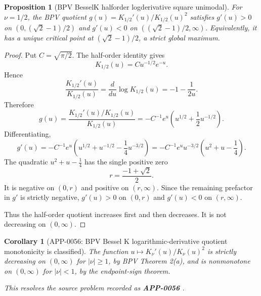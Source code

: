 \documentclass[11pt]{article}
\numberwithin{equation}{section}
\newtheorem{proposition}[theorem]{Proposition}
\newtheorem{corollary}[theorem]{Corollary}
\theoremstyle{definition}
\theoremstyle{remark}
\newcommand{\1}{\mathbf 1}
\begin{document}
\begin{proposition}[BPV BesselK halforder logderivative square unimodal]
\label{res:bpv-besselk-halforder-logderivative-square-unimodal}
For \(\nu=1/2\), the BPV quotient \(g(u)=K_{1/2}'(u)/K_{1/2}(u)^2\) satisfies \(g'(u)>0\) on \((0,(\sqrt2-1)/2)\) and \(g'(u)<0\) on \(((\sqrt2-1)/2,\infty)\). Equivalently, it has a unique critical point at \((\sqrt2-1)/2\), a strict global maximum.
\end{proposition}

\begin{proof}
Put \(C=\sqrt{\pi/2}\). The half-order identity gives
\[
K_{1/2}(u)=C u^{-1/2}e^{-u}.
\]
Hence
\[
\frac{K_{1/2}'(u)}{K_{1/2}(u)}
=\frac{d}{du}\log K_{1/2}(u)
=-1-\frac{1}{2u}.
\]
Therefore
\[
g(u)=\frac{K_{1/2}'(u)/K_{1/2}(u)}{K_{1/2}(u)}
=-C^{-1}e^u\left(u^{1/2}+\frac12u^{-1/2}\right).
\]
Differentiating,
\[
g'(u)
=-C^{-1}e^u
\left(u^{1/2}+u^{-1/2}-\frac14u^{-3/2}\right)
=-C^{-1}e^u u^{-3/2}\left(u^2+u-\frac14\right).
\]
The quadratic \(u^2+u-\frac14\) has the single positive zero
\[
r=\frac{-1+\sqrt2}{2}.
\]
It is negative on \((0,r)\) and positive on \((r,\infty)\). Since the remaining prefactor in \(g'\) is strictly negative, \(g'(u)>0\) on \((0,r)\) and \(g'(u)<0\) on \((r,\infty)\).

Thus the half-order quotient increases first and then decreases. It is not decreasing on \((0,\infty)\).
\end{proof}

\begin{corollary}[APP-0056: BPV Bessel K logarithmic-derivative quotient monotonicity is classified]
\label{res:bpv-besselk-full-monotonicity-classification}
The function \(u\mapsto K_\nu'(u)/K_\nu(u)^2\) is strictly decreasing on \((0,\infty)\) for \(|\nu|\ge1\), by BPV Theorem 2(a), and is nonmonotone on \((0,\infty)\) for \(|\nu|<1\), by the endpoint-sign theorem.



This resolves the source problem recorded as \textbf{APP-0056} \cite{app-app-0056-source}.
\end{corollary}
\end{document}
